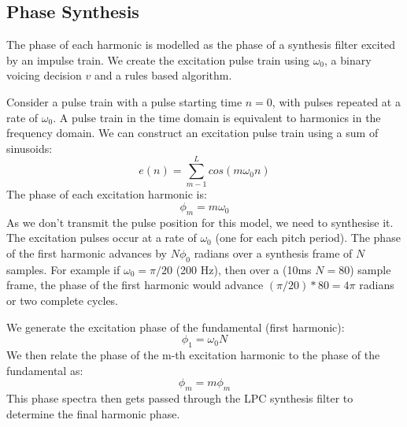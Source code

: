 \documentclass{article}
\begin{document}
\subsection{Phase Synthesis}

The phase of each harmonic is modelled as the phase of a synthesis filter excited by an impulse train. We create the excitation pulse train using $\omega_0$, a binary voicing decision $v$ and a rules based algorithm.

Consider a pulse train with a pulse starting time $n=0$, with pulses repeated at a rate of $\omega_0$.  A pulse train in the time domain is equivalent to harmonics in the frequency domain.  We can construct an excitation pulse train using a sum of sinusoids:
\begin{equation}
e(n) = \sum_{m-1}^L cos(m \omega_0 n)
\end{equation}
The phase of each excitation harmonic is:
\begin{equation}
\phi_m = m \omega_0
\end{equation}
As we don't transmit the pulse position for this model, we need to synthesise it.  The excitation pulses occur at a rate of $\omega_0$ (one for each pitch period). The phase of the first harmonic advances by $N \phi_0$ radians over a synthesis frame of $N$ samples.  For example if $\omega_0 = \pi /20$ (200 Hz), then over a (10ms $N=80$) sample frame, the phase of the first harmonic would advance $(\pi/20)*80 = 4 \pi$ radians or two complete cycles.

We generate the excitation phase of the fundamental (first harmonic):
\begin{equation}
\phi_1 = \omega_0 N
\end{equation}
We then relate the phase of the m-th excitation harmonic to the phase of the fundamental as:
\begin{equation}
\phi_m = m\phi_m
\end{equation}
This phase spectra then gets passed through the LPC synthesis filter to determine the final harmonic phase.
\end{document}
